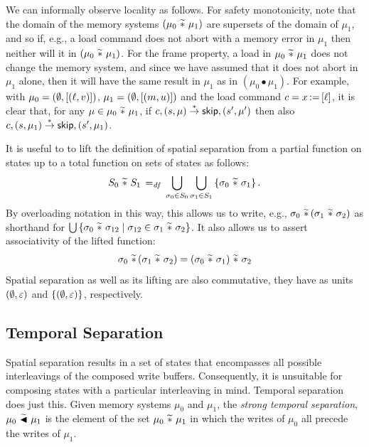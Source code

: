 \documentclass[11pt]{report}
\begin{document}
We can informally observe locality as follows. For safety monotonicity, note that the domain of the memory systems $(\mu_0 \operatorname{\,\widetilde{\ast}\,} \mu_1)$ are supersets of the domain of $\mu_1$, and so if, e.g., a load command does not abort with a memory error in $\mu_1$ then neither will it in $(\mu_0 \operatorname{\,\widetilde{\ast}\,} \mu_1)$. For the frame property, a load in $\mu_0 \operatorname{\,\widetilde{\ast}\,} \mu_1$ does not change the memory system, and since we have assumed that it does not abort in $\mu_1$ alone, then it will have the same result in $\mu_1$ as in $(\mu_0 \bullet \mu_1)$. For example, with $\mu_0 = (\operatorname{\emptyset},\left[(\ell,v)\right])$, $\mu_1 = (\operatorname{\emptyset},\left[(m,u)\right])$ and the load command $c = x \operatorname{:\!=} \left[ \ell \right]$, it is clear that, for any $\mu \in \mu_0 \operatorname{\,\widetilde{\ast}\,} \mu_1$, if $c,(s,\mu) \stackrel{\ast}{\rightarrow} \operatorname{\mathsf{skip}},(s',\mu')$ then also $c,(s,\mu_1) \stackrel{\ast}{\rightarrow} \operatorname{\mathsf{skip}},(s',\mu_1)$.

It is useful to to lift the definition of spatial separation from a partial function on states up to a total function on sets of states as follows: \[ S_0 \operatorname{\,\widetilde{\ast}\,} S_1 \operatorname{\;=_{\mathit{df}}\;} \bigcup_{\sigma_0 \in S_0} \bigcup_{\sigma_1 \in S_1} \left\lbrace \sigma_0 \operatorname{\,\widetilde{\ast}\,} \sigma_1 \right\rbrace.\] By overloading notation in this way, this allows us to write, e.g., $\sigma_0 \operatorname{\,\widetilde{\ast}\,} (\sigma_1 \operatorname{\,\widetilde{\ast}\,} \sigma_2)$ as shorthand for $\bigcup \left\lbrace \sigma_0 \operatorname{\,\widetilde{\ast}\,} \sigma_{12} \mid \sigma_{12} \in \sigma_1 \operatorname{\,\widetilde{\ast}\,} \sigma_2 \right\rbrace$. It also allows us to assert associativity of the lifted function: \[ \sigma_0 \operatorname{\,\widetilde{\ast}\,} (\sigma_1 \operatorname{\,\widetilde{\ast}\,} \sigma_2) = (\sigma_0 \operatorname{\,\widetilde{\ast}\,} \sigma_1) \operatorname{\,\widetilde{\ast}\,} \sigma_2 \] Spatial separation as well as its lifting are also commutative, they have as units $(\operatorname{\emptyset},\varepsilon)$ and $\left\lbrace (\operatorname{\emptyset},\varepsilon) \right\rbrace$, respectively. 

\subsection{Temporal Separation}
\label{sec:sequential-temporal-separation}

Spatial separation results in a set of states that encompasses all possible interleavings of the composed write buffers. Consequently, it is unsuitable for composing states with a particular interleaving in mind. Temporal separation does just this. Given memory systems $\mu_0$ and $\mu_1$, the \emph{strong temporal separation}, $\mu_0 \operatorname{\,\widetilde{\blacktriangleleft}\,} \mu_1$ is the element of the set $\mu_0 \operatorname{\,\widetilde{\ast}\,} \mu_1$ in which the writes of $\mu_0$ all precede the writes of $\mu_1$. 
\end{document}
